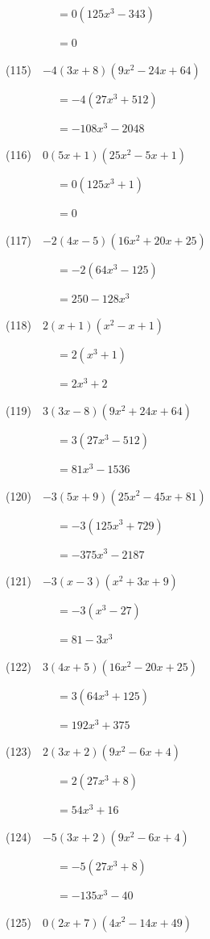 \documentclass[a4j,twocolumn,10pt,fleqn]{jarticle}
\begin{document}
~~~~~~~~~$=0(125 x^{3} - 343)$

~~~~~~~~~$=0$

(115)~~$-4\left(3 x + 8\right) \left(9 x^{2} - 24 x + 64\right)$

~~~~~~~~~$=-4(27 x^{3} + 512)$

~~~~~~~~~$=- 108 x^{3} - 2048$

(116)~~$0\left(5 x + 1\right) \left(25 x^{2} - 5 x + 1\right)$

~~~~~~~~~$=0(125 x^{3} + 1)$

~~~~~~~~~$=0$

(117)~~$-2\left(4 x - 5\right) \left(16 x^{2} + 20 x + 25\right)$

~~~~~~~~~$=-2(64 x^{3} - 125)$

~~~~~~~~~$=250 - 128 x^{3}$

(118)~~$2\left(x + 1\right) \left(x^{2} - x + 1\right)$

~~~~~~~~~$=2(x^{3} + 1)$

~~~~~~~~~$=2 x^{3} + 2$

(119)~~$3\left(3 x - 8\right) \left(9 x^{2} + 24 x + 64\right)$

~~~~~~~~~$=3(27 x^{3} - 512)$

~~~~~~~~~$=81 x^{3} - 1536$

(120)~~$-3\left(5 x + 9\right) \left(25 x^{2} - 45 x + 81\right)$

~~~~~~~~~$=-3(125 x^{3} + 729)$

~~~~~~~~~$=- 375 x^{3} - 2187$

(121)~~$-3\left(x - 3\right) \left(x^{2} + 3 x + 9\right)$

~~~~~~~~~$=-3(x^{3} - 27)$

~~~~~~~~~$=81 - 3 x^{3}$

(122)~~$3\left(4 x + 5\right) \left(16 x^{2} - 20 x + 25\right)$

~~~~~~~~~$=3(64 x^{3} + 125)$

~~~~~~~~~$=192 x^{3} + 375$

(123)~~$2\left(3 x + 2\right) \left(9 x^{2} - 6 x + 4\right)$

~~~~~~~~~$=2(27 x^{3} + 8)$

~~~~~~~~~$=54 x^{3} + 16$

(124)~~$-5\left(3 x + 2\right) \left(9 x^{2} - 6 x + 4\right)$

~~~~~~~~~$=-5(27 x^{3} + 8)$

~~~~~~~~~$=- 135 x^{3} - 40$

(125)~~$0\left(2 x + 7\right) \left(4 x^{2} - 14 x + 49\right)$
\end{document}
